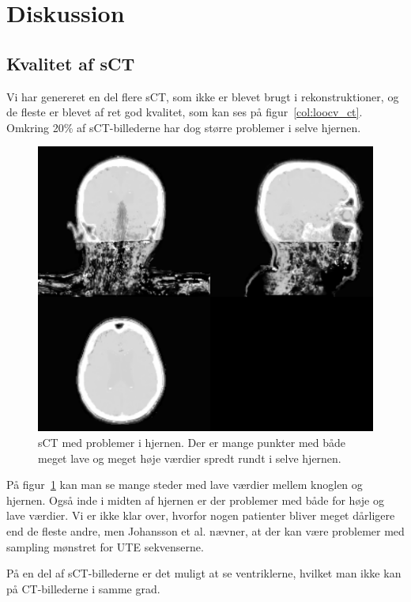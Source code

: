 \section{Diskussion}

\subsection{Kvalitet af sCT}


Vi har genereret en del flere sCT, som ikke er blevet brugt i rekonstruktioner,  og de fleste er blevet af ret god kvalitet, som kan ses på figur~\ref{col:loocv_ct}. Omkring 20\% af sCT-billederne har dog større problemer i selve hjernen.

\begin{figure}
   \includegraphics[width=\textwidth]{billeder/sct_problemer.png}
   \caption{sCT med problemer i hjernen. Der er mange punkter med både meget lave og meget høje værdier spredt rundt i selve hjernen.}
   \label{sct_problemer}
\end{figure}

På figur~\ref{sct_problemer} kan man se mange steder med lave værdier mellem knoglen og hjernen. Også inde i midten af hjernen er der problemer med både for høje og lave værdier. Vi er ikke klar over, hvorfor nogen patienter bliver meget dårligere end de fleste andre, men Johansson et al. nævner, at der kan være problemer med sampling mønstret for UTE sekvenserne.

På en del af sCT-billederne er det muligt at se ventriklerne, hvilket man ikke kan på CT-billederne i samme grad.


